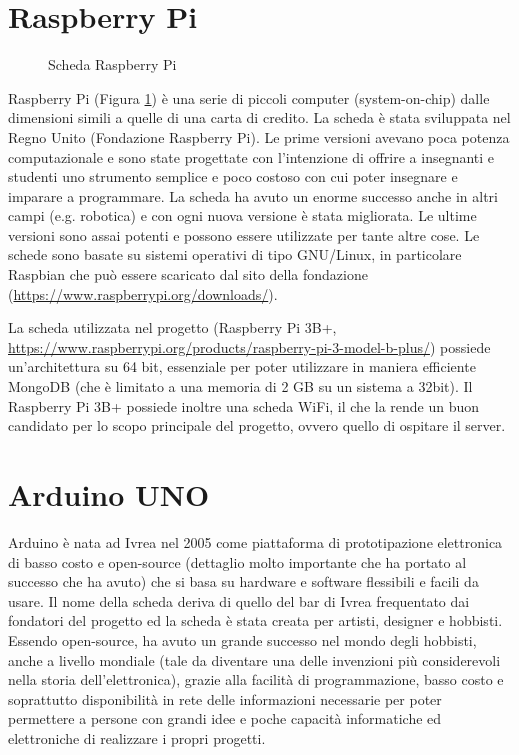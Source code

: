 \documentclass[12pt]{report}
\begin{document}
%
\section{Raspberry Pi}
%


\begin{figure}
	\caption{Scheda Raspberry Pi}
	\label{fig:raspi}
\end{figure}

Raspberry Pi (Figura \ref{fig:raspi}) è una serie di piccoli computer (system-on-chip) dalle dimensioni simili a quelle di una carta di credito. La scheda è stata sviluppata nel Regno Unito (Fondazione Raspberry Pi). Le prime versioni avevano poca potenza computazionale e sono state progettate con l'intenzione di offrire a insegnanti e studenti uno strumento semplice e poco costoso con cui poter insegnare e imparare a programmare. La scheda ha avuto un enorme successo anche in altri campi (e.g$.$ robotica) e con ogni nuova versione è stata migliorata. Le ultime versioni sono assai potenti e possono essere utilizzate per tante altre cose. Le schede sono basate su sistemi operativi di tipo GNU/Linux, in particolare Raspbian che può essere scaricato dal sito della fondazione (\url{https://www.raspberrypi.org/downloads/}). 

La scheda utilizzata nel progetto (Raspberry Pi 3B+, \url{https://www.raspberrypi.org/products/raspberry-pi-3-model-b-plus/}) possiede un'architettura su 64 bit, essenziale per poter utilizzare in maniera efficiente MongoDB (che è limitato a una memoria di 2 GB su un sistema a 32bit). 
Il Raspberry Pi 3B+ possiede inoltre una scheda WiFi, il che la rende un buon candidato per lo scopo principale del progetto, ovvero quello di ospitare il server.


%
\section{Arduino UNO}
%

Arduino\cite{arduino_storia} è nata ad Ivrea nel 2005 come piattaforma di prototipazione elettronica di basso costo e open-source (dettaglio molto importante che ha portato al successo che ha avuto) che si basa su hardware e software flessibili e facili da usare. Il nome della scheda deriva di quello del bar di Ivrea frequentato dai fondatori del progetto ed la scheda è stata creata per artisti, designer e hobbisti. Essendo open-source, ha avuto un grande successo nel mondo degli hobbisti, anche a livello mondiale (tale da diventare una delle invenzioni più considerevoli nella storia dell'elettronica), grazie alla facilità di programmazione, basso costo e soprattutto disponibilità in rete delle informazioni necessarie per poter permettere a persone con grandi idee e poche capacità informatiche ed elettroniche di realizzare i propri progetti. 
\end{document}
